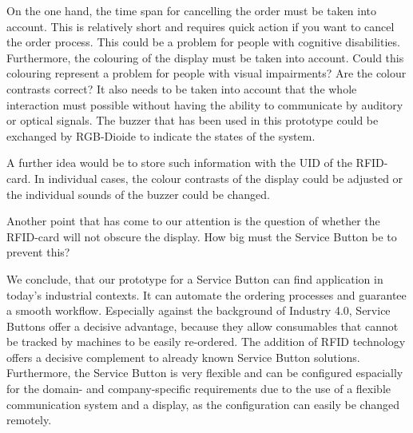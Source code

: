 
On the one hand, the time span for cancelling the order must be taken into account. This is relatively short and requires quick action if you want to cancel the order process. This could be a problem for people with cognitive disabilities. Furthermore, the colouring of the display must be taken into account. Could this colouring represent a problem for people with visual impairments? Are the colour contrasts correct? It also needs to be taken into account that the whole interaction must possible without having the ability to communicate by auditory or optical signals. The buzzer that has been used in this prototype could be exchanged by RGB-Dioide to indicate the states of the system.

A further idea would be to store such information with the UID of the RFID-card. In individual cases, the colour contrasts of the display could be adjusted or the individual sounds of the buzzer could be changed.

Another point that has come to our attention is the question of whether the RFID-card will not obscure the display. How big must the Service Button be to prevent this?

We conclude, that our prototype for a Service Button can find application in today's industrial contexts. It can automate the ordering processes and guarantee a smooth workflow. Especially against the background of Industry 4.0, Service Buttons offer a decisive advantage, because they allow consumables that cannot be tracked by machines to be easily re-ordered. 
The addition of RFID technology offers a decisive complement to already known Service Button solutions. Furthermore, the Service Button is very flexible and can be configured espacially for the domain- and company-specific requirements due to the use of a flexible communication system and a display, as the configuration can easily be changed remotely.
